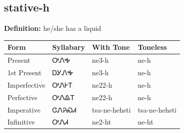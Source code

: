 \documentclass{article}%
\begin{document}
\subsection*{stative-h}%
\textbf{Definition: }%
he/she has a liquid%
\\[0.5em]%
\begin{tabular}{|l|l|l|l|}%
\hline%
\textbf{Form}&\textbf{Syllabary}&\textbf{With Tone}&\textbf{Toneless}\\%
\hline%
Present&ᎤᏁᎭ&ne3{-}h&ne{-}h\\%
1st Present&ᎠᎩᏁᎭ&ne3{-}h&ne{-}h\\%
Imperfective&ᎤᏁᎰᎢ&ne22{-}h&ne{-}h\\%
Perfective&ᎤᏁᎲᎢ&ne22{-}h&ne{-}h\\%
Imperative&ᏣᏁᎮᏍᏗ&tsa{-}ne{-}hehsti&tsa{-}ne{-}hehsti\\%
Infinitive&ᎤᏁᏗ&ne2{-}ht&ne{-}ht\\%
\hline%
\end{tabular}%
\\[1em]%
\end{document}
